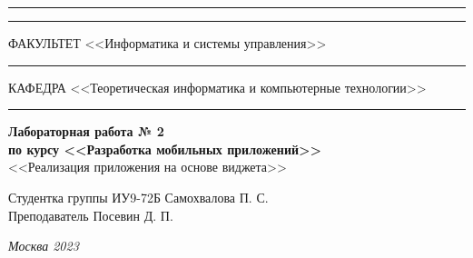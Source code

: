 \documentclass[a4paper, 14pt]{extarticle}
\begin{document}
\begin{titlepage}
\vspace{-25pt}
\hspace{-35pt}\rule{\textwidth}{2.3pt}

\vspace*{-20.3pt}
\hspace{-35pt}\rule{\textwidth}{0.4pt}

\vspace{1.5ex}
\hspace{-35pt} \noindent \small ФАКУЛЬТЕТ\hspace{80pt} <<Информатика и системы управления>>

\vspace*{-16pt}
\hspace{47pt}\rule{0.83\textwidth}{0.4pt}

\vspace{0.5ex}
\hspace{-35pt} \noindent \small КАФЕДРА\hspace{50pt} <<Теоретическая информатика и компьютерные технологии>>

\vspace*{-16pt}
\hspace{30pt}\rule{0.866\textwidth}{0.4pt}
  
\vspace{11em}

\begin{center}
\Large {\bf Лабораторная работа № 2} \\
\large {\bf по курсу <<Разработка мобильных приложений>>} \\
\large <<Реализация приложения на основе виджета>>
\end{center}\normalsize

\vspace{8em}


\begin{flushright}
  {Студентка группы ИУ9-72Б Самохвалова П. С. \hspace*{15pt}\\
  \vspace{2ex}
  Преподаватель Посевин Д. П.\hspace*{15pt}}
\end{flushright}

\bigskip

\vfill
 

\begin{center}
\textsl{Москва 2023}
\end{center}
\end{titlepage}
\end{document}
